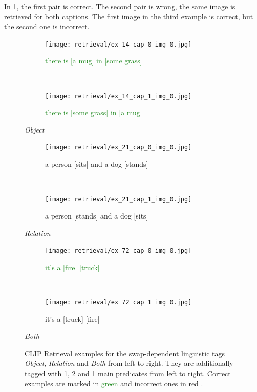 In \cref{fig:retrieval-examples-linguistic}, the first pair is correct. The second pair is wrong, the same image is retrieved for both captions. The first image in the third example is correct, but the second one is incorrect.

\begin{figure}[ht]
\centering
    \begin{minipage}[t]{.30\textwidth}
        \begin{subfigure}[t]{\textwidth}
        \centering
        \texttt{[image: retrieval/ex\_14\_cap\_0\_img\_0.jpg]}
        \caption{\textcolor{ForestGreen}{there is [a mug] in [some grass] \cmark}}
        \end{subfigure}\\
        \begin{subfigure}[t]{\textwidth}
        \centering
        \texttt{[image: retrieval/ex\_14\_cap\_1\_img\_0.jpg]}
        \caption{\textcolor{ForestGreen}{there is [some grass] in [a mug] \cmark}}
        \end{subfigure}%
        \caption*{\textit{Object}}
    \end{minipage}
    \hfill
    \begin{minipage}[t]{.32\textwidth}
        \begin{subfigure}[t]{\textwidth}
        \centering
        \texttt{[image: retrieval/ex\_21\_cap\_0\_img\_0.jpg]}
        \caption{\textcolor{BrickRed}{a person [sits] and a dog [stands] \xmark}}
        \end{subfigure}\\
        \begin{subfigure}[t]{\textwidth}
        \centering
        \texttt{[image: retrieval/ex\_21\_cap\_1\_img\_0.jpg]}
        \caption{\textcolor{BrickRed}{a person [stands] and a dog [sits] \xmark}}
        \end{subfigure}%
        \caption*{\textit{Relation}}
    \end{minipage}
    \hfill
    \begin{minipage}[t]{.30\textwidth}
        \begin{subfigure}[t]{\textwidth}
        \centering
        \texttt{[image: retrieval/ex\_72\_cap\_0\_img\_0.jpg]}
        \caption{\textcolor{ForestGreen}{it's a [fire] [truck] \cmark}}
        \end{subfigure}\\
        \begin{subfigure}[t]{\textwidth}
        \centering
        \texttt{[image: retrieval/ex\_72\_cap\_1\_img\_0.jpg]}
        \caption{\textcolor{BrickRed}{it's a [truck] [fire] \xmark}}
        \end{subfigure}%
        \caption*{\textit{Both}}
    \end{minipage}%
    \caption{CLIP Retrieval examples for the swap-dependent linguistic tags \textit{Object}, \textit{Relation} and \textit{Both} from left to right. They are additionally tagged with 1, 2 and 1 main predicates from left to right.  Correct examples are marked in \textcolor{ForestGreen}{green \cmark} and incorrect ones in \textcolor{BrickRed}{red \xmark}.}
    \label{fig:retrieval-examples-linguistic}
\end{figure}

